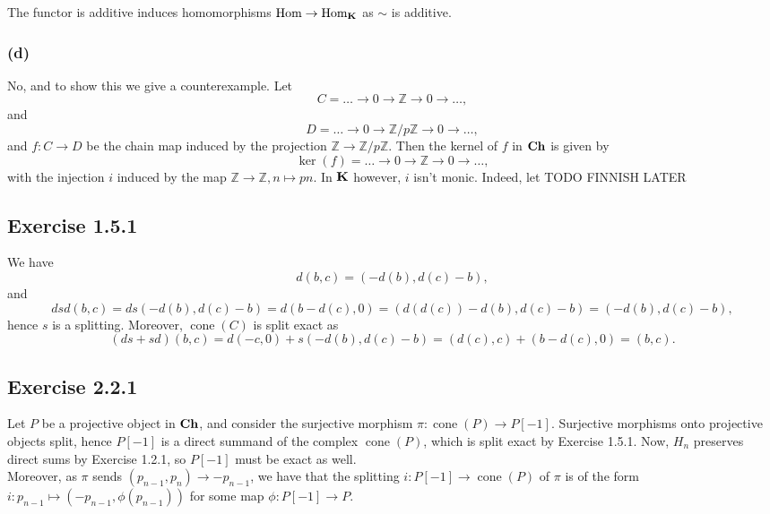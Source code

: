 \documentclass{article}
\theoremstyle{definition}
\newcommand{\Z}{\mathbb{Z}}
\DeclareMathOperator{\cone}{cone}
\newcommand{\Hom}{\text{Hom}}
\newcommand{\catname}[1]{{\normalfont\textbf{#1}}}
\newcommand{\Ch}{\catname{Ch}}
\newcommand{\CK}{\catname{K}}
\begin{document}
The functor is additive induces homomorphisms $\Hom \to \Hom_{\CK}$ as $\sim$
is additive. \\

\subsubsection*{(d)}

No, and to show this we give a counterexample. Let
\[
	C = \ldots \rightarrow 0 \rightarrow \Z \rightarrow 0 \rightarrow \ldots,
\]
and
\[
	D = \ldots \rightarrow 0 \rightarrow \Z/p\Z \rightarrow 0 \rightarrow \ldots,
\]
and $f : C \to D$ be the chain map induced by the projection $\Z \to \Z/p\Z$.
Then the kernel of $f$ in $\Ch$ is given by
\[
	\ker(f) = \ldots \rightarrow 0 \rightarrow \Z \rightarrow 0 \rightarrow \ldots,
\]
with the injection $i$ induced by the map $\Z \to \Z, n \mapsto pn$. In $\CK$
however, $i$ isn't monic. Indeed, let TODO FINNISH LATER

\subsection*{Exercise 1.5.1}

We have 
\[
	d(b, c)
	=
	(-d(b), d(c) - b),
\] 
and
\[
	dsd(b, c)
	=
	ds(-d(b), d(c) - b)
	=
	d(b - d(c), 0)
	=
	(d(d(c)) - d(b), d(c) - b)
	=
	(-d(b), d(c) - b),
\] 
hence $s$ is a splitting. Moreover, $\cone(C)$ is split exact as
\[
	(ds + sd)(b, c)
	=
	d(-c, 0) + s(-d(b), d(c) - b)
	=
	(d(c), c) + (b - d(c), 0)
	=
	(b, c).
\] 

\subsection*{Exercise 2.2.1}


Let $P$ be a projective object in $\Ch$, and consider the surjective
morphism $\pi : \cone(P) \to P[-1]$. Surjective morphisms onto projective
objects split, hence $P[-1]$ is a direct summand of the complex $\cone(P)$,
which is split exact by Exercise 1.5.1. Now, $H_n$ preserves direct sums by
Exercise 1.2.1, so $P[-1]$ must be exact as well. \\

Moreover, as $\pi$ sends $(p_{n - 1}, p_n) \to -p_{n - 1}$, we have that the
splitting $i : P[-1] \to \cone(P)$ of $\pi$ is of the form $i : p_{n - 1}
\mapsto (-p_{n - 1}, \phi(p_{n - 1}))$ for some map $\phi : P[-1] \to P$. \\
\end{document}
